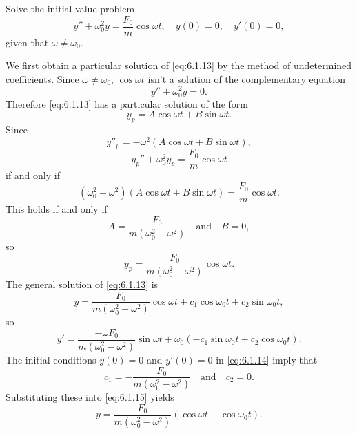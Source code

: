 \documentclass{ximera}
\begin{document}
 
\begin{example}\label{example:6.1.4}
 Solve the initial value problem
\begin{equation}\label{eq:6.1.14}
y''+\omega_0^2y=\frac{F_0}{m}\cos\omega t, \quad  y(0)=0,\quad y'(0)=0,
\end{equation}
 given that $\omega\neq\omega_0$.
 
 
 
\begin{explanation}
We first obtain a particular solution of \eqref{eq:6.1.13} by the method
of undetermined coefficients. Since $\omega\ne\omega _0$,
 $\cos\omega t$ isn't  a solution of the complementary equation
$$
y''+\omega_0^2y=0.
$$
Therefore \eqref{eq:6.1.13} has a particular solution of the form
$$
y_p=A\cos\omega t+B\sin\omega t.
$$
Since
$$
y''_p=-\omega^2(A\cos\omega t+B\sin\omega t),
$$
$$
y_p''+\omega_0^2y_p=\frac{F_0}{m}\cos\omega t
$$
if and only if
$$
(\omega_0^2-\omega^2)\left(A\cos\omega t+
B\sin\omega t\right)=\frac{F_0}{m}\cos\omega t.
$$
 This holds if and only if
$$
A=\frac{F_0}{m(\omega_0^2-\omega^2)}\quad\mbox{and}\quad B=0,
$$
so
$$
y_p=\frac{F_0}{m(\omega_0^2-\omega^2)}\cos\omega t.
$$
The general solution of \eqref{eq:6.1.13}  is
\begin{equation}\label{eq:6.1.15}
y=\frac{F_0}{m(\omega_0^2-\omega^2)}\cos\omega t
+c_1\cos\omega_0 t+c_2\sin\omega_0t,
\end{equation}
so
$$
y'=\frac{-\omega F_0}{m(\omega_0^2-\omega^2)}\sin\omega t
+\omega_0(-c_1\sin\omega_0 t+c_2\cos\omega_0t).
$$
The initial conditions $y(0)=0$ and $y'(0)=0$ in \eqref{eq:6.1.14} imply
that
$$
c_1=-\frac{F_0}{m(\omega_0^2-\omega^2)}\quad\mbox{and}\quad
c_2=0.
$$
Substituting these into \eqref{eq:6.1.15} yields
\begin{equation}\label{eq:6.1.16}
y=\frac{F_0}{m(\omega_0^2-\omega^2)}(\cos\omega t-\cos\omega
_0t).
\end{equation}
 

\end{explanation}
\end{example}
\end{document}
